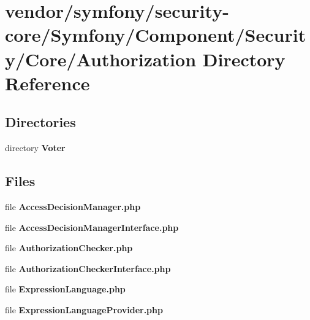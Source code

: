 \section{vendor/symfony/security-\/core/\+Symfony/\+Component/\+Security/\+Core/\+Authorization Directory Reference}
\label{dir_979bc280f60ef11d9472651b58f95fe6}
\subsection*{Directories}
\begin{DoxyCompactItemize}
\item 
directory {\bf Voter}
\end{DoxyCompactItemize}
\subsection*{Files}
\begin{DoxyCompactItemize}
\item 
file {\bf Access\+Decision\+Manager.\+php}
\item 
file {\bf Access\+Decision\+Manager\+Interface.\+php}
\item 
file {\bf Authorization\+Checker.\+php}
\item 
file {\bf Authorization\+Checker\+Interface.\+php}
\item 
file {\bf Expression\+Language.\+php}
\item 
file {\bf Expression\+Language\+Provider.\+php}
\end{DoxyCompactItemize}
